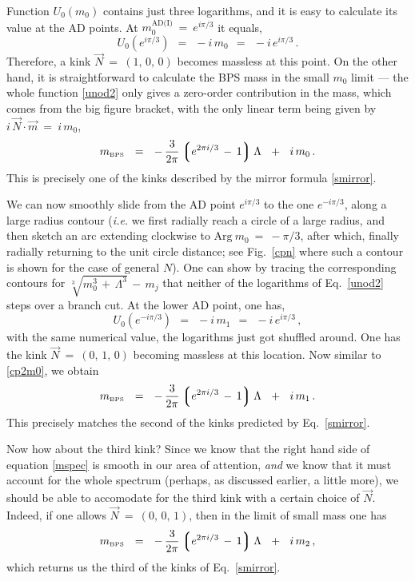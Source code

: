 \documentclass[epsfig,12pt]{article}
\def\beq{\begin{equation}}
\def\eeq{\end{equation}}
\def\beq{\begin{equation}}
\def\eeq{\end{equation}}
\newcommand{\lgr}{\left\lgroup}
\newcommand{\rgr}{\right\rgroup}
\newcommand{\mbps}{m_{\text{\tiny BPS}}}
\begin{document}
	Function $ U_0(m_0) $ contains just three logarithms, and it is easy to calculate its value
	at the AD points.
	At $ m_0^\text{AD(I)} ~=~ e^{ i \pi / 3 } $ it equals,
\beq
	U_0(e^{ i \pi / 3 }) ~~=~~ - i\, m_0 ~~=~~ -i\, e^{ i \pi/ 3}\,. 
\eeq
	Therefore, a kink $ \vec{N} ~=~ ( 1,\, 0,\, 0 ) $ becomes massless at this point.
	On the other hand, it is straightforward to calculate the BPS mass in the small $ m_0 $ limit --- 
	the whole function \eqref{unod2} only gives a zero-order contribution in the mass, which comes from the big figure bracket,
	with the only linear term being given by $ i\, \vec{N} \cdot \vec{m} ~=~ i\, m_0 $,
\beq
\label{cp2m0}
	\mbps  ~~=~~ -\, \frac{3}{2\pi} \lgr e^{2 \pi i / 3} \,-\, 1 \rgr \Lambda ~~+~~ i\, m_0\,.
\eeq
	This is precisely one of the kinks described by the mirror formula \eqref{smirror}.

	We can now smoothly slide from the AD point $ e^{ i \pi / 3 } $ to the one $ e^{ - i \pi / 3 } $,
	along a large radius contour ({\it i.e.} we first radially reach a circle of a large radius, and then
	sketch an arc extending clockwise to $ \text{Arg}~m_0 ~=~ - \pi / 3 $, after which, finally radially returning
	to the unit circle distance; see Fig.~\ref{cpn} where such a contour is shown for the case of general $ N $).
	One can show by tracing the corresponding contours for $ \sqrt[3]{ m_0^3 \,+\, \Lambda^3 } \,-\, m_j $ 
	that neither of the logarithms of Eq.~\eqref{unod2} steps over a branch cut. 
	At the lower AD point, one has, 
\beq
\label{cp2m1}
	U_0(e^{ - i \pi / 3 }) ~~=~~ -i\, m_1 ~~=~~ -i\, e^{ i \pi / 3 }\,,
\eeq
	with the same numerical value, the logarithms just got shuffled around.
	One has the kink $ \vec{N} ~=~ ( 0,\, 1,\, 0 ) $ becoming massless at this location. 
	Now similar to \eqref{cp2m0}, we obtain
\beq
	\mbps ~~=~~ -\, \frac{3}{2\pi} \lgr e^{2 \pi i / 3} \,-\, 1 \rgr \Lambda ~~+~~ i\, m_1\,.
\eeq
	This precisely matches the second of the kinks predicted by Eq.~\eqref{smirror}.

	Now how about the third kink? 
	Since we know that the right hand side of equation \eqref{mspec} is smooth in our area of attention,
	{\it and} we know that it must account for the whole spectrum (perhaps, as discussed earlier, a little more), 
	we should be able to accomodate for the third kink with a certain choice of $ \vec{N} $.
	Indeed, if one allows $ \vec{N} ~=~ (0,\, 0,\, 1) $, then in the limit of small mass one has
\beq
\label{k2}
	\mbps ~~=~~ -\, \frac{3}{2\pi} \lgr e^{2 \pi i / 3} \,-\, 1 \rgr \Lambda ~~+~~ i\, m_2\,,
\eeq
	which returns us the third of the kinks of Eq.~\eqref{smirror}.
	
\end{document}
